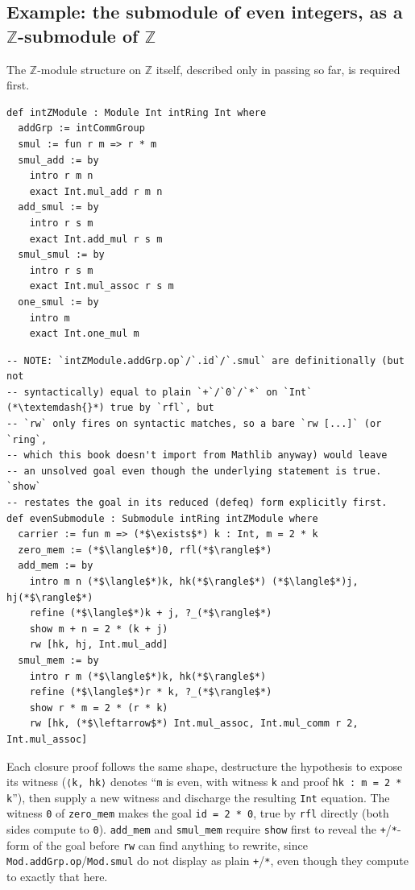 \subsection{\texorpdfstring{Example: the submodule of even integers, as a \(\mathbb{Z}\)-submodule of \(\mathbb{Z}\)}{Example: the submodule of even integers, as a \textbackslash mathbb\{Z\}-submodule of \textbackslash mathbb\{Z\}}}\label{sec:11-modules:04-submodules:2}

The \(\mathbb{Z}\)-module structure on \(\mathbb{Z}\) itself, described only in passing so far, is required first.

\begin{lstlisting}
def intZModule : Module Int intRing Int where
  addGrp := intCommGroup
  smul := fun r m => r * m
  smul_add := by
    intro r m n
    exact Int.mul_add r m n
  add_smul := by
    intro r s m
    exact Int.add_mul r s m
  smul_smul := by
    intro r s m
    exact Int.mul_assoc r s m
  one_smul := by
    intro m
    exact Int.one_mul m
\end{lstlisting}

\begin{lstlisting}
-- NOTE: `intZModule.addGrp.op`/`.id`/`.smul` are definitionally (but not
-- syntactically) equal to plain `+`/`0`/`*` on `Int` (*\textemdash{}*) true by `rfl`, but
-- `rw` only fires on syntactic matches, so a bare `rw [...]` (or `ring`,
-- which this book doesn't import from Mathlib anyway) would leave
-- an unsolved goal even though the underlying statement is true. `show`
-- restates the goal in its reduced (defeq) form explicitly first.
def evenSubmodule : Submodule intRing intZModule where
  carrier := fun m => (*$\exists$*) k : Int, m = 2 * k
  zero_mem := (*$\langle$*)0, rfl(*$\rangle$*)
  add_mem := by
    intro m n (*$\langle$*)k, hk(*$\rangle$*) (*$\langle$*)j, hj(*$\rangle$*)
    refine (*$\langle$*)k + j, ?_(*$\rangle$*)
    show m + n = 2 * (k + j)
    rw [hk, hj, Int.mul_add]
  smul_mem := by
    intro r m (*$\langle$*)k, hk(*$\rangle$*)
    refine (*$\langle$*)r * k, ?_(*$\rangle$*)
    show r * m = 2 * (r * k)
    rw [hk, (*$\leftarrow$*) Int.mul_assoc, Int.mul_comm r 2, Int.mul_assoc]
\end{lstlisting}

Each closure proof follows the same shape, destructure the hypothesis to expose its witness (\texttt{⟨k, hk⟩} denotes ``\texttt{m} is even, with witness \texttt{k} and proof \texttt{hk : m = 2 * k}''), then supply a new witness and discharge the resulting \texttt{Int} equation. The witness \texttt{0} of \texttt{zero\_\allowbreak{}mem} makes the goal \texttt{id = 2 * 0}, true by \texttt{rfl} directly (both sides compute to \texttt{0}). \texttt{add\_\allowbreak{}mem} and \texttt{smul\_\allowbreak{}mem} require \texttt{show} first to reveal the \texttt{+}/\texttt{*}-form of the goal before \texttt{rw} can find anything to rewrite, since \texttt{Mod.addGrp.op}/\texttt{Mod.smul} do not display as plain \texttt{+}/\texttt{*}, even though they compute to exactly that here.

